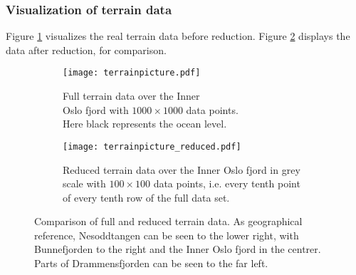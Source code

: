 \subsubsection*{Visualization of terrain data}
Figure \ref{fig:terrainpic} visualizes the real terrain data before reduction. Figure \ref{fig:terrainpic_reduced} displays the data after reduction, for comparison.

\begin{figure}[htbp]
	\centering
	\begin{subfigure}{.5\textwidth}
		\centering
		\texttt{[image: terrainpicture.pdf]}
		\caption{Full terrain data over the Inner \\Oslo fjord with $1000\times 1000$ data points. \\Here black represents the ocean level.}
		\label{fig:terrainpic}
	\end{subfigure}%
	\begin{subfigure}{.5\textwidth}
		\centering
		\texttt{[image: terrainpicture\_reduced.pdf]}
		\caption{Reduced terrain data over the Inner Oslo fjord in grey scale with $100\times 100$ data points, i.e. every tenth point of every tenth row of the full data set.}
	\label{fig:terrainpic_reduced}
	\end{subfigure}
	\caption{Comparison of full and reduced terrain data. As geographical reference, Nesoddtangen can be seen to the lower right, with Bunnefjorden to the right and the Inner Oslo fjord in the centrer. Parts of Drammensfjorden can be seen to the far left.}
	\label{fig:terrain}
\end{figure}

